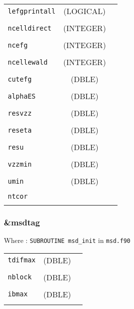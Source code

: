 \documentclass[10pt,a4paper]{article}
\begin{document}
\begin{tabular}{lcc}
\\
\verb?lefgprintall? & (LOGICAL) & \\
\\
\verb?ncelldirect?  & (INTEGER) & \\
\\
\verb?ncefg?        & (INTEGER) & \\
\\
\verb?ncellewald?   & (INTEGER) & \\
\\
\verb?cutefg?  & (DBLE) & \\
\\
\verb?alphaES? & (DBLE) & \\
\\
\verb?resvzz?  & (DBLE) & \\
\\
\verb?reseta?  & (DBLE) & \\
\\
\verb?resu?    & (DBLE) & \\
\\
\verb?vzzmin?  & (DBLE) & \\ 
\\
\verb?umin?    & (DBLE) & \\
\\
\verb?ntcor? & & \\
\\
\end{tabular}


\subsubsection{\&msdtag}

Where : \verb?SUBROUTINE msd_init? in \verb?msd.f90?

\begin{tabular}{lcc}
\\
\verb?tdifmax? & (DBLE) & \\
\\
\verb?nblock? & (DBLE) & \\
\\
\verb?ibmax? & (DBLE) & \\
\\
\end{tabular}
\end{document}
